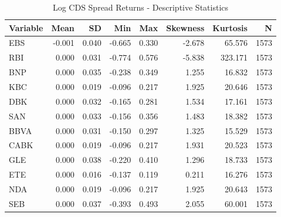 \begin{table}

\caption{Log CDS Spread Returns - Descriptive Statistics}
\centering
\begin{tabular}[t]{lrrrrrrr}
\toprule
Variable & Mean & SD & Min & Max & Skewness & Kurtosis & N\\
\midrule
EBS & -0.001 & 0.040 & -0.665 & 0.330 & -2.678 & 65.576 & 1573\\
RBI & 0.000 & 0.031 & -0.774 & 0.576 & -5.838 & 323.171 & 1573\\
BNP & 0.000 & 0.035 & -0.238 & 0.349 & 1.255 & 16.832 & 1573\\
KBC & 0.000 & 0.019 & -0.096 & 0.217 & 1.925 & 20.646 & 1573\\
DBK & 0.000 & 0.032 & -0.165 & 0.281 & 1.534 & 17.161 & 1573\\
\addlinespace
SAN & 0.000 & 0.033 & -0.156 & 0.356 & 1.483 & 18.382 & 1573\\
BBVA & 0.000 & 0.031 & -0.150 & 0.297 & 1.325 & 15.529 & 1573\\
CABK & 0.000 & 0.019 & -0.096 & 0.217 & 1.931 & 20.523 & 1573\\
GLE & 0.000 & 0.038 & -0.220 & 0.410 & 1.296 & 18.733 & 1573\\
ETE & 0.000 & 0.016 & -0.137 & 0.119 & 0.211 & 16.276 & 1573\\
\addlinespace
NDA & 0.000 & 0.019 & -0.096 & 0.217 & 1.925 & 20.643 & 1573\\
SEB & 0.000 & 0.037 & -0.393 & 0.493 & 2.055 & 60.001 & 1573\\
\bottomrule
\end{tabular}
\end{table}
